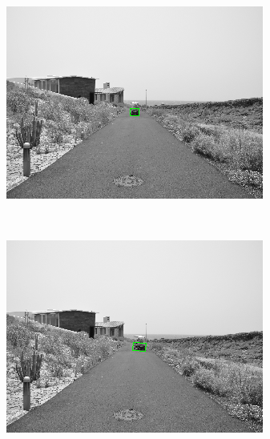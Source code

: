 \begin{figure}[h!]
        \centering
        \begin{subfigure}[b]{0.24\columnwidth}
	    \includegraphics[width=\textwidth]{sequence/seq1}\label{fig:seq1}
        \end{subfigure}%
        ~
        \begin{subfigure}[b]{0.24\columnwidth}
	    \includegraphics[width=\textwidth]{sequence/seq2}\label{fig:seq2}
        \end{subfigure}%
        ~
        \begin{subfigure}[b]{0.24\columnwidth}

\end{subfigure}
\end{figure}

